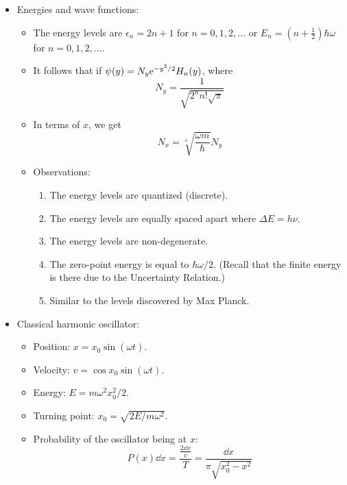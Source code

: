 \documentclass[../notes.tex]{subfiles}
\begin{document}
\begin{itemize}
\begin{itemize}
    \end{itemize}
    \item Energies and wave functions:
    \begin{itemize}
        \item The energy levels are $\epsilon_n=2n+1$ for $n=0,1,2,\dots$ or $E_n=(n+\frac{1}{2})\hbar\omega$ for $n=0,1,2,\dots$.
        \item It follows that if $\psi(y)=N_y\e[-y^2/2]H_n(y)$, where
        \begin{equation*}
            N_y = \frac{1}{\sqrt{2^nn!\sqrt{\pi}}}
        \end{equation*}
        \item In terms of $x$, we get
        \begin{equation*}
            N_x = \sqrt[4]{\frac{\omega m}{\hbar}}N_y
        \end{equation*}
        \item Observations:
        \begin{enumerate}
            \item The energy levels are quantized (discrete).
            \item The energy levels are equally spaced apart where $\Delta E=h\nu$.
            \item The energy levels are non-degenerate.
            \item The zero-point energy is equal to $\hbar\omega/2$. (Recall that the finite energy is there due to the Uncertainty Relation.)
            \item Similar to the levels discovered by Max Planck.
        \end{enumerate}
    \end{itemize}
    \item Classical harmonic oscillator:
    \begin{itemize}
        \item Position: $x=x_0\sin(\omega t)$.
        \item Velocity: $v=\cos x_0\sin(\omega t)$.
        \item Energy: $E=m\omega^2x_0^2/2$.
        \item Turning point: $x_0=\sqrt{2E/m\omega^2}$.
        \item Probability of the oscillator being at $x$:
        \begin{equation*}
            P(x)\dd{x} = \frac{\frac{2\dd{x}}{v}}{T} = \frac{\dd{x}}{\pi\sqrt{x_0^2-x^2}}
        \end{equation*}

\end{itemize}
\end{itemize}
\end{document}
